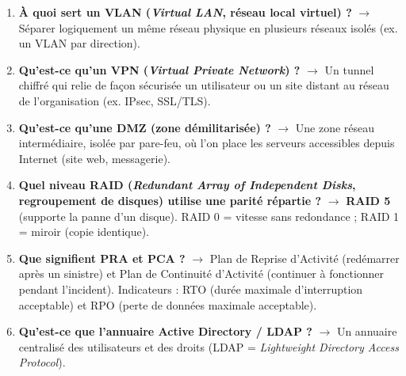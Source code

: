 \begin{enumerate}[leftmargin=*]
    \item \textbf{À quoi sert un VLAN (\textit{Virtual LAN}, réseau local virtuel) ?} $\rightarrow$ Séparer logiquement un même réseau physique en plusieurs réseaux isolés (ex. un VLAN par direction).
    \item \textbf{Qu'est-ce qu'un VPN (\textit{Virtual Private Network}) ?} $\rightarrow$ Un tunnel chiffré qui relie de façon sécurisée un utilisateur ou un site distant au réseau de l'organisation (ex. IPsec, SSL/TLS).
    \item \textbf{Qu'est-ce qu'une DMZ (zone démilitarisée) ?} $\rightarrow$ Une zone réseau intermédiaire, isolée par pare-feu, où l'on place les serveurs accessibles depuis Internet (site web, messagerie).
    \item \textbf{Quel niveau RAID (\textit{Redundant Array of Independent Disks}, regroupement de disques) utilise une parité répartie ?} $\rightarrow$ \textbf{RAID 5} (supporte la panne d'un disque). RAID 0 = vitesse sans redondance ; RAID 1 = miroir (copie identique).
    \item \textbf{Que signifient PRA et PCA ?} $\rightarrow$ Plan de Reprise d'Activité (redémarrer après un sinistre) et Plan de Continuité d'Activité (continuer à fonctionner pendant l'incident). Indicateurs : RTO (durée maximale d'interruption acceptable) et RPO (perte de données maximale acceptable).
    \item \textbf{Qu'est-ce que l'annuaire Active Directory / LDAP ?} $\rightarrow$ Un annuaire centralisé des utilisateurs et des droits (LDAP = \textit{Lightweight Directory Access Protocol}).
\end{enumerate}

